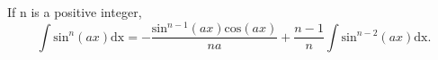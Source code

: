 If n is a positive integer, 
\[ \int \mathrm{sin}^{n} (ax) \mathrm{dx}
= - \frac{ \mathrm{sin}^{n-1} (ax) \mathrm{cos} (ax) }{ na }
  + \frac{n - 1} {n} 
  \int \mathrm{sin}^{n - 2} (ax) \mathrm{dx} . \]